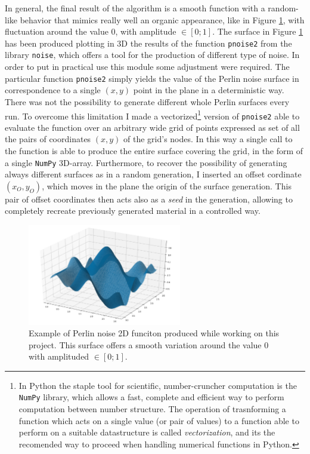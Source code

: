     In general, the final result of the algorithm is a smooth function with a random-like behavior that mimics really well an organic appearance, like in Figure \ref{fig:my_perlin}, with fluctuation around the value 0, with amplitude $ \in [ 0;1] $. The surface in Figure \ref{fig:my_perlin} has been produced plotting in 3D the results of the function \texttt{pnoise2} from the library \texttt{noise}, which offers a tool for the production of different type of noise. In order to put in practical use this module some adjustment were required. The particular function \texttt{pnoise2} simply yields the value of the Perlin noise surface in correspondence to a single $(x,y)$ point in the plane in a deterministic way. There was not the possibility to generate different whole Perlin surfaces every run. To overcome this limitation I made a vectorized\footnote{In Python the staple tool for scientific, number-cruncher computation is the \texttt{NumPy} library, which allows a fast, complete and efficient way to perform computation between number structure. The operation of trasnforming a function which acts on a single value (or pair of values) to a function able to perform on a suitable datastructure is called \textit{vectorization}, and its the recomended way to proceed when handling numerical functions in Python.} version of \texttt{pnoise2} able to evaluate the function over an arbitrary wide grid of points expressed as set of all the pairs of coordinates $(x,y)$ of the grid's nodes. In this way a single call to the function is able to produce the entire surface covering the grid, in the form of a single \texttt{NumPy} 3D-array. Furthermore, to recover the possibility of generating always different surfaces as in a random generation, I inserted an offset cordinate $(x_O,y_O)$, which moves in the plane the origin of the surface generation. This pair of offset coordinates then acts also as a \textit{seed} in the generation, allowing to completely recreate previously generated material in a controlled way.

    \begin{figure}
        \centering
        \includegraphics[width = 0.6\textwidth]{images/perlin}
        \caption{Example of Perlin noise 2D funciton produced while working on this project. This surface offers a smooth variation around the value 0 with amplituded $ \in [ 0;1] $.}
        \label{fig:my_perlin}
    \end{figure}

